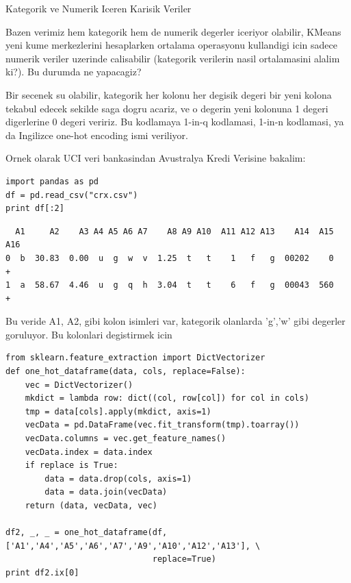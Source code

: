 \documentclass[12pt,fleqn]{article}\usepackage{../common}
\begin{document}
Kategorik ve Numerik Iceren Karisik Veriler

Bazen verimiz hem kategorik hem de numerik degerler iceriyor olabilir,
KMeans yeni kume merkezlerini hesaplarken ortalama operasyonu
kullandigi icin sadece numerik veriler uzerinde calisabilir (kategorik
verilerin nasil ortalamasini alalim ki?). Bu durumda ne yapacagiz?

Bir secenek su olabilir, kategorik her kolonu her degisik degeri bir
yeni kolona tekabul edecek sekilde saga dogru acariz, ve o degerin
yeni kolonuna 1 degeri digerlerine 0 degeri veririz. Bu kodlamaya
1-in-q kodlamasi, 1-in-n kodlamasi, ya da Ingilizce one-hot encoding
ismi veriliyor.

Ornek olarak UCI veri bankasindan Avustralya Kredi Verisine bakalim:

\begin{verbatim}
import pandas as pd
df = pd.read_csv("crx.csv")
print df[:2]
\end{verbatim}

\begin{verbatim}
  A1     A2    A3 A4 A5 A6 A7    A8 A9 A10  A11 A12 A13    A14  A15 A16
0  b  30.83  0.00  u  g  w  v  1.25  t   t    1   f   g  00202    0   +
1  a  58.67  4.46  u  g  q  h  3.04  t   t    6   f   g  00043  560   +
\end{verbatim}

Bu veride A1, A2, gibi kolon isimleri var, kategorik olanlarda 'g','w' gibi
degerler goruluyor. Bu kolonlari degistirmek icin

\begin{verbatim}
from sklearn.feature_extraction import DictVectorizer
def one_hot_dataframe(data, cols, replace=False):
    vec = DictVectorizer()
    mkdict = lambda row: dict((col, row[col]) for col in cols)
    tmp = data[cols].apply(mkdict, axis=1)
    vecData = pd.DataFrame(vec.fit_transform(tmp).toarray())
    vecData.columns = vec.get_feature_names()
    vecData.index = data.index
    if replace is True:
        data = data.drop(cols, axis=1)
        data = data.join(vecData)
    return (data, vecData, vec)

df2, _, _ = one_hot_dataframe(df,['A1','A4','A5','A6','A7','A9','A10','A12','A13'], \
                              replace=True)
print df2.ix[0]
\end{verbatim}
\end{document}
